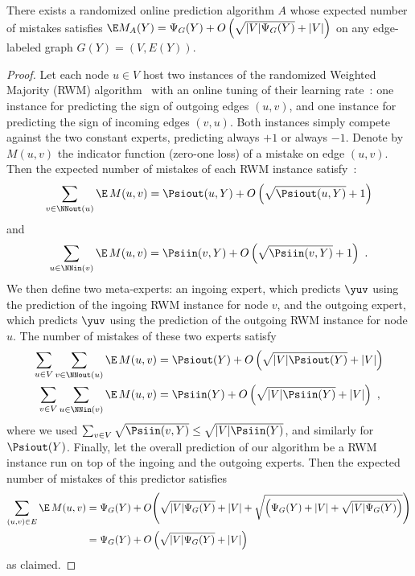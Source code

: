 \begin{theorem}\label{t:online}
  There exists a randomized online prediction algorithm $A$ whose expected number of mistakes
  satisfies $\E M_A(Y) = \Psi_G(Y) + O\left(\sqrt{|V|\Psi_G(Y)} + |V| \right)$
  on any edge-labeled graph $G(Y) = (V,E(Y))$.
\end{theorem}
\begin{proof}

Let each node $u \in V$ host two instances of the randomized Weighted Majority (RWM)
algorithm~\cite{LittlestoneWa94} with an online tuning of their learning rate~\cite{cb+97,acg02}:
one instance for predicting the sign of outgoing edges $(u,v)$, and one instance for predicting the
sign of incoming edges $(v,u)$. Both instances simply compete against the two constant experts,
predicting always $+1$ or always $-1$. Denote by $M(u,v)$ the indicator function (zero-one loss) of
a mistake on edge $(u,v)$. Then the expected number of mistakes of each RWM instance
satisfy~\cite{cb+97,acg02}:
\[
    \sum_{v \in \NNout(u)} \E\,M(u,v) = \Psiout(u,Y) + O\left(\sqrt{\Psiout(u,Y)}+ 1\right)
\]
and
\[
    \sum_{u \in \NNin(v)} \E\,M(u,v) = \Psiin(v,Y) + O\left(\sqrt{\Psiin(v,Y)} + 1\right)~.
\]
We then define two meta-experts: an ingoing expert, which predicts $\yuv$ using the prediction of
the ingoing RWM instance for node $v$, and the outgoing expert, which predicts $\yuv$ using the
prediction of the outgoing RWM instance for node $u$.
The number of mistakes of these two experts satisfy
\begin{align*}
  \sum_{u \in V}\sum_{v \in \NNout(u)} \E\,M(u,v)
                                       &= \Psiout(Y) + O\left(\sqrt{|V|\Psiout(Y)} + |V|\right)\\
  \sum_{v \in V}\sum_{u \in \NNin(v)} \E\,M(u,v)
                                      &= \Psiin(Y)  + O\left(\sqrt{|V|\Psiin(Y)}  + |V|\right)~,
\end{align*}
where we used $\sum_{v \in V} \sqrt{\Psiin(v,Y)} \leq \sqrt{|V|\Psiin(Y)}$, and similarly for
$\Psiout(Y)$.
Finally, let the overall prediction of our algorithm be a RWM instance run on top of the ingoing and
the outgoing experts. Then the expected number of mistakes of this predictor satisfies~
\begin{align*}
  \sum_{(u,v) \in E} \E\,M(u,v) &= \Psi_G(Y) + O\Biggl(\sqrt{|V|\Psi_G(Y)} + |V|
    + \sqrt{\left(\Psi_G(Y) + |V| + \sqrt{|V|\Psi_G(Y)}\right)} \Biggl)\\
    &= \Psi_G(Y) + O\left(\sqrt{|V|\Psi_G(Y)} + |V|\right)
\end{align*}
as claimed.
\end{proof}

